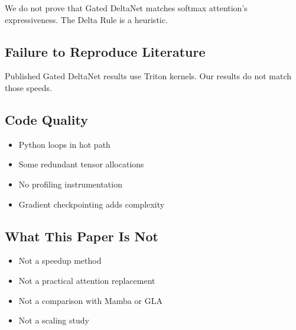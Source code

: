 We do not prove that Gated DeltaNet matches softmax attention's 
expressiveness. The Delta Rule is a heuristic.

\subsection{Failure to Reproduce Literature}

Published Gated DeltaNet results use Triton kernels. Our results do not 
match those speeds.

\subsection{Code Quality}

\begin{itemize}
\item Python loops in hot path
\item Some redundant tensor allocations
\item No profiling instrumentation
\item Gradient checkpointing adds complexity

\end{itemize}
\subsection{What This Paper Is Not}

\begin{itemize}
\item Not a speedup method
\item Not a practical attention replacement
\item Not a comparison with Mamba or GLA
\item Not a scaling study

\end{itemize}
